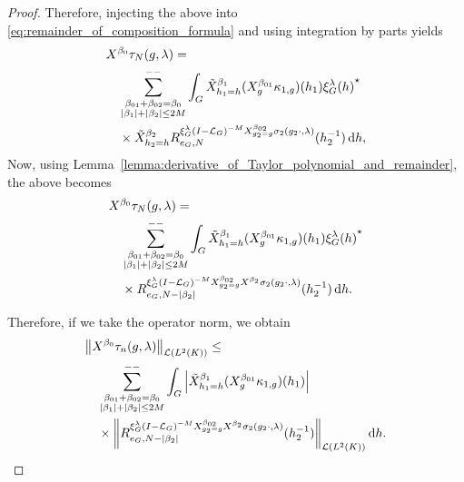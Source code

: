 \begin{proof}
    Therefore,
    injecting the above into \eqref{eq:remainder_of_composition_formula} and using integration by parts yields
    \begin{align*}
        &\LeftDifferentialOperator {\beta_0} \tau_N(g, \lambda) =\\
        &\quad \lcsum{%
            \substack{%
                \beta_{01} + \beta_{02} = \beta_0\\
                \abs {\beta_1} + \abs {\beta_2} \leq 2 M
            }
        }
        \int_\Group \RightDifferentialOperator[h_1 = h] {\beta_1} (\LeftDifferentialOperator [g] {\beta_{01}} \kappa_{1, g})(h_1) \adj {\Rep \lambda(h)}\\
        &\quad \times
        \RightDifferentialOperator[h_2 = h] {\beta_2} \TaylorRemainder {\Rep \lambda \BesselPotentialSquared {-M} \LeftDifferentialOperator [g_2 = g] {\beta_{02}} \sigma_2(g_2 \dummy, \lambda)} {e_\Group} N (h_2^{-1}) \dd h,
    \end{align*}
    Now, using Lemma~\ref{lemma:derivative_of_Taylor_polynomial_and_remainder},
    the above becomes
    \begin{align*}
        &\LeftDifferentialOperator {\beta_0} \tau_N(g, \lambda) =\\
        &\quad \lcsum{%
            \substack{%
                \beta_{01} + \beta_{02} = \beta_0\\
                \abs {\beta_1} + \abs {\beta_2} \leq 2 M
            }
        }
        \int_\Group \RightDifferentialOperator[h_1 = h] {\beta_1} (\LeftDifferentialOperator [g] {\beta_{01}} \kappa_{1, g})(h_1) \adj {\Rep \lambda(h)}\\
        &\quad \times
        \TaylorRemainder {\Rep \lambda \BesselPotentialSquared {-M} \LeftDifferentialOperator [g_2 = g] {\beta_{02}} \LeftDifferentialOperator {\beta_2} \sigma_2(g_2 \dummy, \lambda)} {e_\Group} {N - \abs {\beta_2}} (h_2^{-1}) \dd h.
    \end{align*}

    Therefore,
    if we take the operator norm,
    we obtain
    \begin{align}
        &\norm [\Lin {\Lebesgue 2 \CompactGroup}] {\LeftDifferentialOperator {\beta_0} \tau_n(g, \lambda)} \leq \notag\\
        &\quad \lcsum{%
            \substack{%
                \beta_{01} + \beta_{02} = \beta_0\\
                \abs {\beta_1} + \abs {\beta_2} \leq 2 M
            }
        }
        \int_\Group \abs {\RightDifferentialOperator[h_1 = h] {\beta_1} (\LeftDifferentialOperator [g] {\beta_{01}} \kappa_{1, g})(h_1)} \notag\\
        &\quad \times
        \norm [\Lin {\Lebesgue 2 \CompactGroup}] {%
            \TaylorRemainder {\Rep \lambda \BesselPotentialSquared {-M} \LeftDifferentialOperator [g_2 = g] {\beta_{02}} \LeftDifferentialOperator {\beta_2} \sigma_2(g_2 \dummy, \lambda)} {e_\Group} {N - \abs {\beta_2}} (h_2^{-1})
        } \dd h.
        \label{eq:composition_formula:main_bound_for_negative_order}
    \end{align}


\end{proof}
